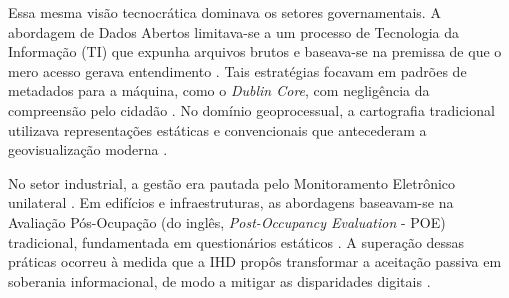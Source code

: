 \documentclass[
	12pt,				%
	oneside,			%
	a4paper,			%
	english,			%
	brazil				%
	]{abntex2ppgsi}
\begin{document}
    Essa mesma visão tecnocrática dominava os setores governamentais. A abordagem de Dados Abertos limitava-se a um processo de Tecnologia da Informação (TI) que expunha arquivos brutos e baseava-se na premissa de que o mero acesso gerava entendimento \cite{Cabitza2020131, JoseViterbo2020}. Tais estratégias focavam em padrões de metadados para a máquina, como o \textit{Dublin Core}, com negligência da compreensão pelo cidadão \cite{barcellos2022towards}. No domínio geoprocessual, a cartografia tradicional utilizava representações estáticas e convencionais que antecederam a geovisualização moderna \cite{Capeleti2024Human}. 

    No setor industrial, a gestão era pautada pelo Monitoramento Eletrônico unilateral \cite{Calvetti2021173}. Em edifícios e infraestruturas, as abordagens baseavam-se na Avaliação Pós-Ocupação (do inglês, \textit{Post-Occupancy Evaluation} - POE) tradicional, fundamentada em questionários estáticos \cite{bavaresco2019technological}. A superação dessas práticas ocorreu à medida que a IHD propôs transformar a aceitação passiva em soberania informacional, de modo a mitigar as disparidades digitais \cite{Refat2023, Hayes2021, Jordan2023, Grace2023, Jandric2023, Pilling2022MoreThan}.

\end{document}
